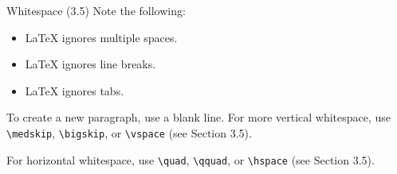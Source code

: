 \documentclass{beamer}
\newcommand{\switch}[1]{\texttt{\textbackslash#1}}
\begin{document}
\begin{frame}{Whitespace (3.5)}
    Note the following:
    \begin{itemize}
        \item \LaTeX{} ignores multiple spaces.
        \item \LaTeX{} ignores line breaks.
        \item \LaTeX{} ignores tabs.
    \end{itemize}

    \bigskip

    To create a new paragraph, use a blank line. For more vertical whitespace, use \switch{medskip}, \switch{bigskip}, or \switch{vspace} (see Section 3.5).

    \bigskip

    For horizontal whitespace, use \switch{quad}, \switch{qquad}, or \switch{hspace} (see Section 3.5).
\end{frame}







\end{document}
